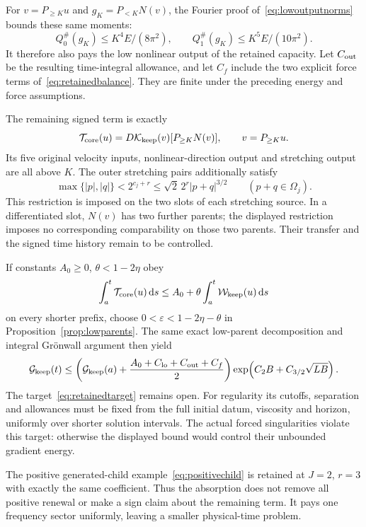 \documentclass[11pt]{article}
\newcommand{\dd}{\,\mathrm d}
\begin{document}
For $v=P_{\geq K}u$ and $g_K=P_{<K}N(v)$, the Fourier proof
of~\eqref{eq:lowoutputnorms} bounds these same moments:
\[
 Q_0^\#(g_K)\leq K^4E/(8\pi^2),\qquad
 Q_1^\#(g_K)\leq K^5E/(10\pi^2).
\]
It therefore also pays the low nonlinear output of the retained capacity.
Let $C_{\rm out}$ be the resulting time-integral allowance, and let
$C_f$ include the two explicit force terms of~\eqref{eq:retainedbalance}.
They are finite under the preceding energy and force assumptions.

The remaining signed term is exactly
\[
 \mathcal T_{\rm core}(u)
   =D\mathcal K_{\rm keep}(v)[P_{\geq K}N(v)],\qquad v=P_{\geq K}u.
\]
Its five original velocity inputs, nonlinear-direction output and
stretching output are all above $K$. The outer stretching pairs additionally
satisfy
\[
 \max\{|p|,|q|\}<2^{c_j+r}
            \leq\sqrt2\,2^r|p+q|^{3/2}\qquad(p+q\in\Omega_j).
\]
This restriction is imposed on the two slots of each stretching source.
In a differentiated slot, $N(v)$ has two further parents; the displayed
restriction imposes no corresponding comparability on those two parents.
Their transfer and the signed time history remain to be controlled.

If constants $A_0\geq0$, $\theta<1-2\eta$ obey
\begin{equation}\label{eq:retainedtarget}
 \int_a^t\mathcal T_{\rm core}(u)\dd s
       \leq A_0+\theta\int_a^t\mathcal W_{\rm keep}(u)\dd s
\end{equation}
on every shorter prefix, choose $0<\varepsilon<1-2\eta-\theta$ in
Proposition~\ref{prop:lowparents}. The same exact low-parent decomposition
and integral Gr\"onwall argument then yield
\[
 \mathcal G_{\rm keep}(t)\leq
 \left(\mathcal G_{\rm keep}(a)
       +\frac{A_0+C_{\rm lo}+C_{\rm out}+C_f}{2}\right)
       \exp\!\left(C_2B+C_{3/2}\sqrt{LB}\right).
\]
The target~\eqref{eq:retainedtarget} remains open. For regularity its
cutoffs, separation and allowances must be fixed from the full initial
datum, viscosity and horizon, uniformly over shorter solution intervals.
The actual forced singularities violate this target: otherwise the
displayed bound would control their unbounded gradient energy.

The positive generated-child example~\eqref{eq:positivechild} is retained
at $J=2$, $r=3$ with exactly the same coefficient. Thus the absorption
does not remove all positive renewal or make a sign claim about the
remaining term. It pays one frequency sector uniformly, leaving a
smaller physical-time problem.
\end{document}
